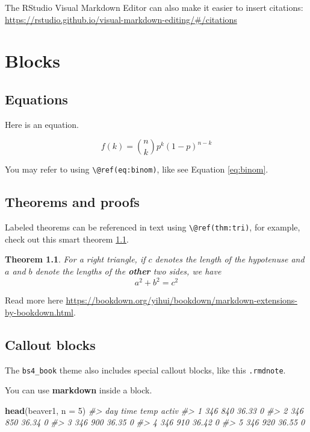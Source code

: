 \documentclass[
]{book}
\newenvironment{Shaded}{\begin{snugshade}}{\end{snugshade}}
\newcommand{\AttributeTok}[1]{\textcolor[rgb]{0.13,0.29,0.53}{#1}}
\newcommand{\CommentTok}[1]{\textcolor[rgb]{0.56,0.35,0.01}{\textit{#1}}}
\newcommand{\DecValTok}[1]{\textcolor[rgb]{0.00,0.00,0.81}{#1}}
\newcommand{\FunctionTok}[1]{\textcolor[rgb]{0.13,0.29,0.53}{\textbf{#1}}}
\newcommand{\NormalTok}[1]{#1}
\newtheorem{theorem}{Theorem}[chapter]
\theoremstyle{definition}
\theoremstyle{definition}
\theoremstyle{definition}
\theoremstyle{definition}
\theoremstyle{remark}
\begin{document}
The RStudio Visual Markdown Editor can also make it easier to insert citations: \url{https://rstudio.github.io/visual-markdown-editing/\#/citations}

\chapter{Blocks}\label{blocks}

\section{Equations}\label{equations}

Here is an equation.

\begin{equation} 
  f\left(k\right) = \binom{n}{k} p^k\left(1-p\right)^{n-k}
  \label{eq:binom}
\end{equation}

You may refer to using \texttt{\textbackslash{}@ref(eq:binom)}, like see Equation \eqref{eq:binom}.

\section{Theorems and proofs}\label{theorems-and-proofs}

Labeled theorems can be referenced in text using \texttt{\textbackslash{}@ref(thm:tri)}, for example, check out this smart theorem \ref{thm:tri}.

\begin{theorem}
\protect\hypertarget{thm:tri}{}\label{thm:tri}For a right triangle, if \(c\) denotes the \emph{length} of the hypotenuse
and \(a\) and \(b\) denote the lengths of the \textbf{other} two sides, we have
\[a^2 + b^2 = c^2\]
\end{theorem}

Read more here \url{https://bookdown.org/yihui/bookdown/markdown-extensions-by-bookdown.html}.

\section{Callout blocks}\label{callout-blocks}

The \texttt{bs4\_book} theme also includes special callout blocks, like this \texttt{.rmdnote}.

You can use \textbf{markdown} inside a block.

\begin{Shaded}
\begin{Highlighting}[]
\FunctionTok{head}\NormalTok{(beaver1, }\AttributeTok{n =} \DecValTok{5}\NormalTok{)}
\CommentTok{\#\textgreater{}   day time  temp activ}
\CommentTok{\#\textgreater{} 1 346  840 36.33     0}
\CommentTok{\#\textgreater{} 2 346  850 36.34     0}
\CommentTok{\#\textgreater{} 3 346  900 36.35     0}
\CommentTok{\#\textgreater{} 4 346  910 36.42     0}
\CommentTok{\#\textgreater{} 5 346  920 36.55     0}
\end{Highlighting}
\end{Shaded}
\end{document}
